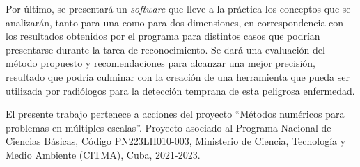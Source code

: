 \par Por \'ultimo, se presentar\'a un \textit{software} que lleve a la pr\'actica los conceptos que se analizar\'an, tanto para una como para dos dimensiones, en correspondencia con los resultados obtenidos por el programa para distintos casos que podr\'ian presentarse durante la tarea de reconocimiento. Se dar\'a una evaluaci\'on del m\'etodo propuesto y recomendaciones para alcanzar una mejor precisi\'on, resultado que podr\'ia culminar con la creaci\'on de una herramienta que pueda ser utilizada por radi\'ologos para la detecci\'on temprana de esta peligrosa enfermedad.\\

\par El presente trabajo pertenece a acciones del proyecto ``Métodos numéricos para problemas en múltiples escalas''. Proyecto asociado al Programa Nacional de Ciencias Básicas, Código PN223LH010-003, Ministerio de Ciencia, Tecnología y Medio Ambiente (CITMA), Cuba, 2021-2023.